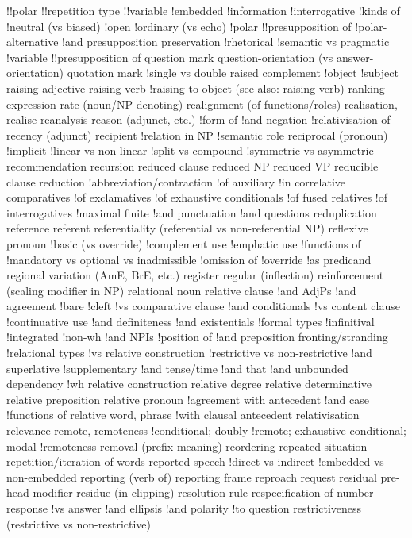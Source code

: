 !!polar
!!repetition type
!!variable
!embedded
!information
!interrogative
!kinds of
!neutral (vs biased)
!open
!ordinary (vs echo)
!polar
!!presupposition of
!polar-alternative
!and presupposition preservation
!rhetorical
!semantic vs pragmatic
!variable
!!presupposition of
question mark
question-orientation (vs answer-orientation)
quotation mark
!single vs double
raised complement
!object
!subject
raising adjective
raising verb
!raising to object (see also: raising verb)
ranking expression
rate (noun/NP denoting)
realignment (of functions/roles)
realisation, realise
reanalysis
reason (adjunct, etc.)
!form of
!and negation
!relativisation of
recency (adjunct)
recipient
!relation in NP
!semantic role
reciprocal (pronoun)
!implicit
!linear vs non-linear
!split vs compound
!symmetric vs asymmetric
recommendation
recursion
reduced clause
reduced NP
reduced VP
reducible clause
reduction
!abbreviation/contraction
!of auxiliary
!in correlative comparatives
!of exclamatives
!of exhaustive conditionals
!of fused relatives
!of interrogatives
!maximal finite
!and punctuation
!and questions
reduplication
reference
referent
referentiality (referential vs non-referential NP)
reflexive pronoun
!basic (vs override)
!complement use
!emphatic use
!functions of
!mandatory vs optional vs inadmissible
!omission of
!override
!as predicand
regional variation (AmE, BrE, etc.)
register
regular (inflection)
reinforcement (scaling modifier in NP)
relational noun
relative clause
!and AdjPs
!and agreement
!bare
!cleft
!vs comparative clause
!and conditionals
!vs content clause
!continuative use
!and definiteness
!and existentials
!formal types
!infinitival
!integrated
!non-wh
!and NPIs
!position of
!and preposition fronting/stranding
!relational types
!vs relative construction
!restrictive vs non-restrictive
!and superlative
!supplementary
!and tense/time
!and that
!and unbounded dependency
!wh
relative construction
relative degree
relative determinative
relative preposition
relative pronoun
!agreement with antecedent
!and case
!functions of
relative word, phrase
!with clausal antecedent
relativisation
relevance
remote, remoteness
!conditional; doubly
!remote; exhaustive conditional; modal
!remoteness
removal (prefix meaning)
reordering
repeated situation
repetition/iteration of words
reported speech
!direct vs indirect
!embedded vs non-embedded
reporting (verb of)
reporting frame
reproach
request
residual pre-head modifier
residue (in clipping)
resolution rule
respecification of number
response
!vs answer
!and ellipsis
!and polarity
!to question
restrictiveness (restrictive vs non-restrictive)

